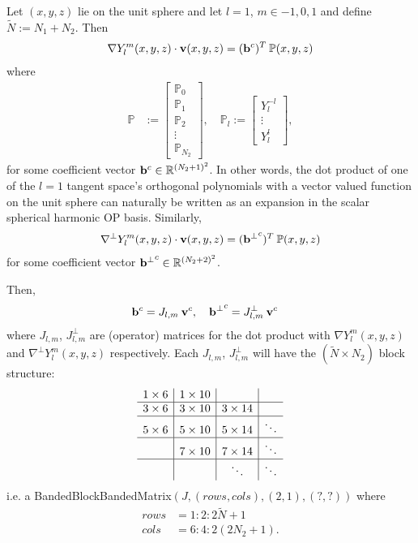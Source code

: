 \documentclass[11pt, oneside]{article}   	%
\newcommand{\R}{\mathbb{R}}
\newcommand{\bigP}{\mathbb{P}}
\newcommand{\Pl}{\mathbb{P}_l}
\newcommand{\gradYlm}{\nabla Y^m_l}
\newcommand{\gradpYlm}{\nabla^\perp Y^m_l}
\begin{document}
Let \((x,y,z)\) lie on the unit sphere and let \(l = 1\), \(m \in {-1, 0, 1}\) and define \(\tilde{N} := N_1 + N_2\). Then
\begin{align}
\gradYlm(x,y,z) \cdot \bold{v}(x,y,z) = (\bold{b}^c)^T  \: \bigP(x,y,z)
\end{align}
where
\begin{align}
\bigP &:= \begin{bmatrix}
		\bigP_0 \\
		\bigP_1 \\
		\bigP_2 \\
		\vdots \\
		\bigP_{N_2}
	  \end{bmatrix}, \quad 
\Pl := \begin{bmatrix}
		Y_l^{-l} \\
		\vdots \\	
		Y_l^l
	  \end{bmatrix},
\end{align}
for some coefficient vector \(\bold{b}^c \in \R^{(N_2+1)^2}\). In other words, the dot product of one of the \(l=1\) tangent space's orthogonal polynomials with a vector valued function on the unit sphere can naturally be written as an expansion in the scalar spherical harmonic OP basis. Similarly,
\begin{align}
\gradpYlm(x,y,z) \cdot \bold{v}(x,y,z) = (\bold{b^\perp}^c)^T  \: \bigP(x,y,z)
\end{align}
for some coefficient vector \(\bold{b^\perp}^c \in \R^{(N_2+2)^2}\).

Then, 
\begin{align}
\bold{b}^c &= J_{l,m} \: \bold{v}^c, \quad 
\bold{b^\perp}^c = J^\perp_{l,m} \: \bold{v}^c
\end{align}
where \(J_{l,m}\), \(J^\perp_{l,m}\) are (operator) matrices for the dot product with \(\gradYlm(x,y,z)\) and \(\gradpYlm(x,y,z)\) respectively.
Each \(J_{l,m}\), \(J^\perp_{l,m}\) will have the \((\tilde{N} \times N_2)\) block structure:
\begin{align}
	\begin{array}{c|c|c|c}
		1 \times 6 & 1 \times 10 & \\
		\hline
		3 \times 6 & 3 \times 10 & 3 \times 14 & \\
		\hline
		5 \times 6 & 5 \times 10 & 5 \times 14 & \ddots \\
		\hline
		&  7 \times 10 & 7 \times 14 & \ddots \\
		\hline
		& & \ddots & \ddots \\
	  \end{array}
\end{align}
i.e. a BandedBlockBandedMatrix\((J, (rows, cols), (2,1), (?,?))\) where 
\begin{align}
rows &= 1:2:2\tilde{N}+1 \\
cols &= 6:4:2(2N_2+1).
\end{align}
\end{document}
